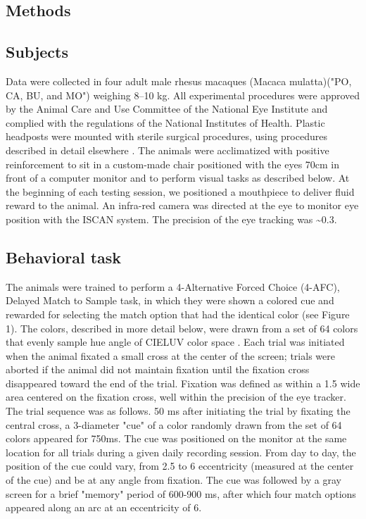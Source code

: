 \documentclass[9pt,biorxiv,lineno,onehalfspacing]{lapreprint}
\begin{document}
\begin{refsection}
\if@endfloat\clearpage\processdelayedfloats\clearpage\fi 

\newpage

\section{Methods}

\subsection{Subjects}

Data were collected in four adult male rhesus macaques (Macaca mulatta)("PO, CA, BU, and MO") weighing 8–10 kg. 
All experimental procedures were approved by the Animal Care and Use Committee of the National Eye Institute and complied with the regulations of the National Institutes of Health. 
Plastic headposts were mounted with sterile surgical procedures, using procedures described in detail elsewhere \citep{lafer-sousa_parallel_2013}. 
The animals were acclimatized with positive reinforcement to sit in a custom-made chair positioned with the eyes 70cm in front of a computer monitor and to perform visual tasks as described below. 
At the beginning of each testing session, we positioned a mouthpiece to deliver fluid reward to the animal. 
An infra-red camera was directed at the eye to monitor eye position with the ISCAN system. 
The precision of the eye tracking was \textasciitilde0.3\degree{}. 

\subsection{Behavioral task}

The animals were trained to perform a 4-Alternative Forced Choice (4-AFC), Delayed Match to Sample task, in which they were shown a colored cue and rewarded for selecting the match option that had the identical color (see Figure 1). 
The colors, described in more detail below, were drawn from a set of 64 colors that evenly sample hue angle of CIELUV color space \citep{stockman_colorimetry_2010}. 
Each trial was initiated when the animal fixated a small cross at the center of the screen; trials were aborted if the animal did not maintain fixation until the fixation cross disappeared toward the end of the trial. 
Fixation was defined as within a 1.5\degree{} wide area centered on the fixation cross, well within the precision of the eye tracker.
The trial sequence was as follows. 
50 ms after initiating the trial by fixating the central cross, a 3\degree{}-diameter "cue"  of a color randomly drawn from the set of 64 colors appeared for 750ms. 
The cue was positioned on the monitor at the same location for all trials during a given daily recording session.
From day to day, the position of the cue could vary, from 2.5\degree{} to 6\degree{} eccentricity (measured at the center of the cue) and be at any angle from fixation.
The cue was followed by a gray screen for a brief "memory" period of 600-900 ms, after which four match options appeared along an arc at an eccentricity of 6\degree{}. 


\end{refsection}
\end{document}
